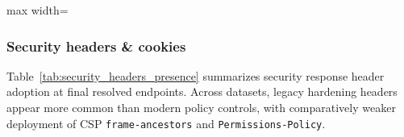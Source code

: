 \documentclass[conference]{IEEEtran}
\begin{document}
\begin{table}[t]
  \caption{Security.txt adoption and field completeness by dataset.}
  \label{tab:securitytxt_summary}
  \centering
  \scriptsize
  \setlength{\tabcolsep}{2.2pt} 
  \renewcommand{\arraystretch}{1.15}

  \begin{adjustbox}{max width=\columnwidth}
  \end{adjustbox}
\end{table}

\subsubsection{Security headers \& cookies}
Table~\ref{tab:security_headers_presence} summarizes security response header adoption at final resolved endpoints. Across datasets, legacy hardening headers appear more common than modern policy controls, with comparatively weaker deployment of CSP \texttt{frame-ancestors} and \texttt{Permissions-Policy}. 
\end{document}
